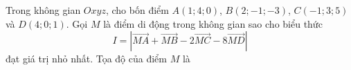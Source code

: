 \begin{ex}
Trong không gian $Oxyz$, cho bốn điểm $A(1;4;0)$, $B(2;-1;-3)$, $C(-1;3;5)$ và $D(4;0;1)$. Gọi $M$ là điểm di động trong không gian sao cho biểu thức \[I=\left|\overrightarrow{MA}+\overrightarrow{MB}-2\overrightarrow{MC}-8\overrightarrow{MD}\right|\] đạt giá trị nhỏ nhất. Tọa độ của điểm $M$ là
\end{ex}
